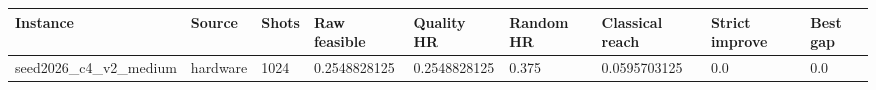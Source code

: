 \begin{tabular}{lllllllll}
\toprule
Instance & Source & Shots & Raw feasible & Quality HR & Random HR & Classical reach & Strict improve & Best gap \\
\midrule
seed2026\_c4\_v2\_medium & hardware & 1024 & 0.2548828125 & 0.2548828125 & 0.375 & 0.0595703125 & 0.0 & 0.0 \\
\bottomrule
\end{tabular}
